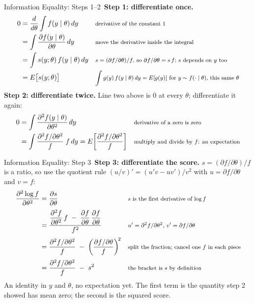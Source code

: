 \documentclass[aspectratio=169,11pt,xcolor=dvipsnames]{beamer}
\newcommand{\E}{E}
\newcommand{\adv}{\,\raisebox{0.6pt}{\textcolor{accent}{$\bigstar$}}}
\begin{document}
\begin{frame}{Information Equality: Steps 1--2\adv}
\textbf{Step 1: differentiate once.}
\begingroup
\setlength{\abovedisplayskip}{2pt}\setlength{\belowdisplayskip}{2pt}
\begin{align*}
  0 &= \frac{d}{d\theta}\int f(y\mid\theta)\,dy
    && \text{\footnotesize derivative of the constant $1$} \\
    &= \int \frac{\partial f(y\mid\theta)}{\partial\theta}\,dy
    && \text{\footnotesize move the derivative inside the integral} \\
    &= \int s(y;\theta)\, f(y\mid\theta)\,dy
    && \text{\footnotesize $s = (\partial f/\partial\theta)/f$, so $\partial f/\partial\theta = s\,f$; $s$ depends on $y$ too} \\
    &= \E\big[s(y;\theta)\big]
    && \text{\footnotesize $\int g(y)\,f(y\mid\theta)\,dy = \E[g(y)]$ for $y\sim f(\cdot\mid\theta)$, this same $\theta$}
\end{align*}
\endgroup
\textbf{Step 2: differentiate twice.} Line two above is $0$ at every $\theta$; differentiate it again:
\begingroup
\setlength{\abovedisplayskip}{2pt}\setlength{\belowdisplayskip}{2pt}
\begin{align*}
  0 &= \int \frac{\partial^2 f(y\mid\theta)}{\partial\theta^2}\,dy
    && \text{\footnotesize derivative of a zero is zero} \\
    &= \int \frac{\partial^2 f/\partial\theta^2}{f}\; f\,dy
     = \E\!\left[\frac{\partial^2 f/\partial\theta^2}{f}\right]
    && \text{\footnotesize multiply and divide by $f$: an expectation}
\end{align*}
\endgroup
\end{frame}

\begin{frame}{Information Equality: Step 3\adv}
\textbf{Step 3: differentiate the score.} $s = (\partial f/\partial\theta)/f$
is a ratio, so use the quotient rule $(u/v)' = (u'v - uv')/v^2$ with
$u = \partial f/\partial\theta$ and $v = f$:
\begingroup
\setlength{\abovedisplayskip}{2pt}\setlength{\belowdisplayskip}{2pt}
\begin{align*}
  \frac{\partial^2 \log f}{\partial\theta^2}
  &= \frac{\partial s}{\partial\theta}
    && \text{\footnotesize $s$ is the first derivative of $\log f$} \\[2pt]
  &= \frac{\dfrac{\partial^2 f}{\partial\theta^2}\, f
          \;-\; \dfrac{\partial f}{\partial\theta}\,\dfrac{\partial f}{\partial\theta}}{f^{2}}
    && \text{\footnotesize $u' = \partial^2 f/\partial\theta^2$, $v' = \partial f/\partial\theta$} \\[2pt]
  &= \frac{\partial^2 f/\partial\theta^2}{f}
     \;-\; \left(\frac{\partial f/\partial\theta}{f}\right)^{\!2}
    && \text{\footnotesize split the fraction; cancel one $f$ in each piece} \\[2pt]
  &= \frac{\partial^2 f/\partial\theta^2}{f} \;-\; s^{2}
    && \text{\footnotesize the bracket is $s$ by definition}
\end{align*}
\endgroup
\vskip2pt
An identity in $y$ and $\theta$, no expectation yet. The first term is the
quantity step 2 showed has mean zero; the second is the squared score.
\end{frame}
\end{document}

